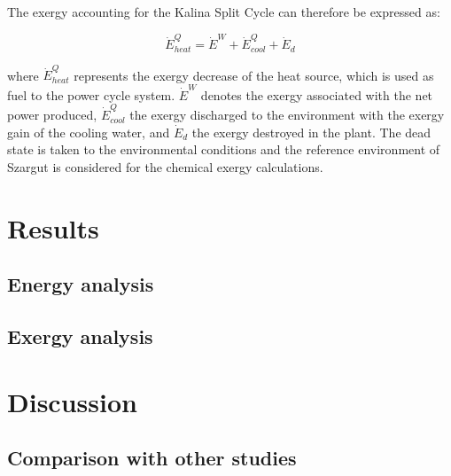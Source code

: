 \documentclass[final,times,5p]{elsarticle}
\begin{document}

	The exergy accounting for the Kalina Split Cycle can therefore be expressed as:

	\begin{equation}
		\dot{E}^{Q}_{heat}=\dot{E}^{W}+\dot{E}^{Q}_{cool}+\dot{E}_{d}
	\end{equation}

	where $\dot{E}^{Q}_{heat}$ represents the exergy decrease of the heat source, which is used as fuel to the power cycle system. $\dot{E}^{W}$ denotes the exergy associated with the net power produced, $\dot{E}^{Q}_{cool}$ the exergy discharged to the environment with the exergy gain of the cooling water, and $\dot{E}_{d}$ the exergy destroyed in the plant. The dead state is taken to the environmental conditions and the reference environment of Szargut \cite{Szargut1998} is considered for the chemical exergy calculations.
	

		

\section{Results}
\label{sec:results}

\subsection{Energy analysis}

\subsection{Exergy analysis}


\section{Discussion}
\label{sec:discussion}

	\subsection{Comparison with other studies}
\end{document}
